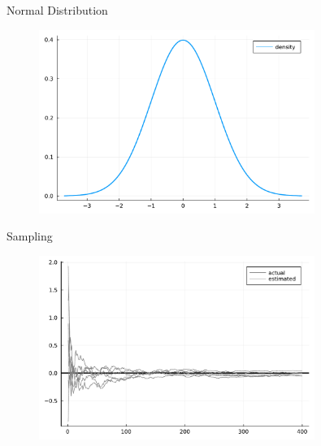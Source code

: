 \documentclass[aspectratio=169,xcolor=svgnames]{beamer}
\begin{document}
\begin{frame}{Normal Distribution}
  \begin{figure}[ht]
    \centering
    \includegraphics[width=0.8\textwidth]{figures/normal_distribution.pdf}
  \end{figure}
\end{frame}

\begin{frame}{Sampling}
  \begin{figure}[ht]
    \centering
    \includegraphics[width=0.8\textwidth]{figures/mean_error.pdf}
  \end{figure}
\end{frame}
\end{document}
